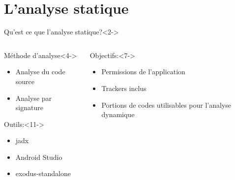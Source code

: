\documentclass[aspectratio=1610,]{beamer}%
\begin{document}
 
\section{L'analyse statique}
\begin{frame}[t]
  \slidetitle[]
  \begin{block}{Qu'est ce que l'analyse statique?}<2->
  \end{block}
  \vspace{-0.5cm}
  \begin{columns}[t]
    \begin{column}{0.48\textwidth}
      \begin{block}{Méthode d'analyse}<4->
        \begin{itemize}
        \item<5-> Analyse du code source
        \item<6-> Analyse par signature
        \end{itemize}
        \end{block}
      \begin{block} {Outils:}<11->
      \begin{itemize}
      \item<12-> jadx
      \item<13-> Android Studio
      \item<14-> exodus-standalone
      \end{itemize}
      \end{block}
    \end{column}
  \begin{column}{0.48\textwidth}
      \begin{block}{Objectifs:}<7->
      \begin{itemize}
        \item<8-> Permissions de l'application
        \item<9-> Trackers inclus
        \item<10-> Portions de codes utilisables pour l'analyse dynamique
        \end{itemize}
      \end{block}
    \end{column}
  \end{columns}
  \end{frame}
  
\end{document}
